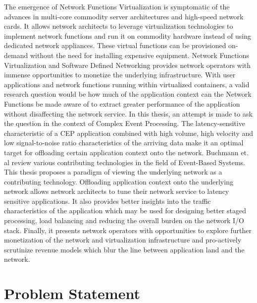 \newline \newline
The emergence of Network Functions Virtualization is symptomatic of the advances in multi-core commodity server architectures and high-speed network cards. It allows network architects to leverage virtualization technologies to implement network functions and run it on commodity hardware instead of using dedicated network appliances. These virtual functions can be provisioned on-demand without the need for installing expensive equipment. Network Functions Virtualization and Software Defined Networking provides network operators with immense opportunities to monetize the underlying infrastructure. With user applications and network functions running within virtualized containers, a valid research question would be how much of the application context can the Network Functions be made aware of to extract greater performance of the application without disaffecting the network service. In this thesis, an attempt is made to ask the question in the context of Complex Event Processing. The latency-sensitive characteristic of a CEP application combined with high volume, high velocity and low signal-to-noise ratio characteristics of the arriving data make it an optimal target for offloading certain application context onto the network.  
\newline \newline
Buchmann et. al \cite{Hinze:2009:EAE:1619258.1619260} review various contributing technologies in the field of Event-Based Systems. This thesis proposes a paradigm of viewing the underlying network as a contributing technology. Offloading application context onto the underlying network allows network architects to tune their network service to latency sensitive applications. It also provides better insights into the traffic characteristics of the application which may be used for designing better staged processing,  load balancing and reducing the overall burden on the network I/O stack. Finally, it presents network operators with opportunities to explore further monetization of the network and virtualization infrastructure and pro-actively scrutinize revenue models which blur the line between application land and the network.

\section{Problem Statement}

